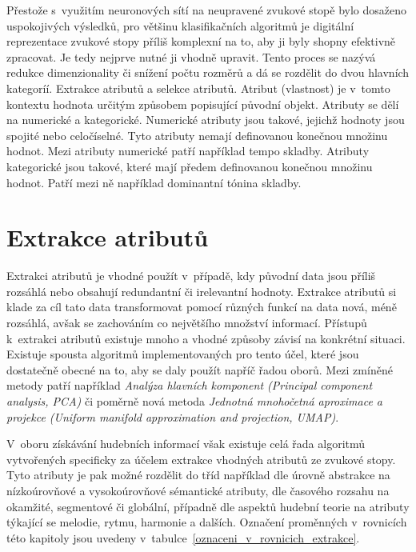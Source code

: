 Přestože s~využitím neuronových sítí na neupravené zvukové stopě bylo dosaženo uspokojivých výsledků, pro většinu klasifikačních algoritmů je digitální reprezentace zvukové stopy příliš komplexní na to, aby ji byly shopny efektivně zpracovat. Je tedy nejprve nutné ji vhodně upravit. Tento proces se nazývá redukce dimenzionality či snížení počtu rozměrů a dá se rozdělit do dvou hlavních kategoríí. Extrakce atributů a selekce atributů. Atribut (vlastnost) je v~tomto kontextu hodnota určitým způsobem popisující původní objekt. Atributy se dělí na numerické a kategorické. Numerické atributy jsou takové, jejichž hodnoty jsou spojité nebo celočíselné. Tyto atributy nemají definovanou konečnou množinu hodnot. Mezi atributy numerické patří například tempo skladby. Atributy kategorické jsou takové, které mají předem definovanou konečnou množinu hodnot. Patří mezi ně například dominantní tónina skladby.\cite{MIR}\cite{8733572}\cite{aca}

\section{Extrakce atributů}
\label{extrakce_atributu}
Extrakci atributů je vhodné použít v~případě, kdy původní data jsou příliš rozsáhlá nebo obsahují redundantní či irelevantní hodnoty. Extrakce atributů si klade za cíl tato data transformovat pomocí různých funkcí na data nová, méně rozsáhlá, avšak se zachováním co největšího množství informací. Přístupů k~extrakci atributů existuje mnoho a vhodné způsoby závisí na konkrétní situaci. Existuje spousta algoritmů implementovaných pro tento účel, které jsou dostatečně obecné na to, aby se daly použít napříč řadou oborů. Mezi zmíněné metody patří například \textit{Analýza hlavních komponent (Principal component analysis, PCA)} či poměrně nová metoda \textit{Jednotná mnohočetná aproximace a projekce (Uniform manifold approximation and projection, UMAP)}.\cite{data_classification}\cite{lel2018umap}\cite{aca}

V~oboru získávání hudebních informací však existuje celá řada algoritmů vytvořených specificky za účelem extrakce vhodných atributů ze zvukové stopy. Tyto atributy je pak možné rozdělit do tříd například dle úrovně abstrakce na nízkoúrovňové a vysokoúrovňové sémantické atributy, dle časového rozsahu na okamžité, segmentové či globální, případně dle aspektů hudební teorie na atributy týkající se melodie, rytmu, harmonie a dalších. Označení proměnných v~rovnicích této kapitoly jsou uvedeny v~tabulce~\ref{oznaceni_v_rovnicich_extrakce}.\cite{MIR}\cite{aca}

